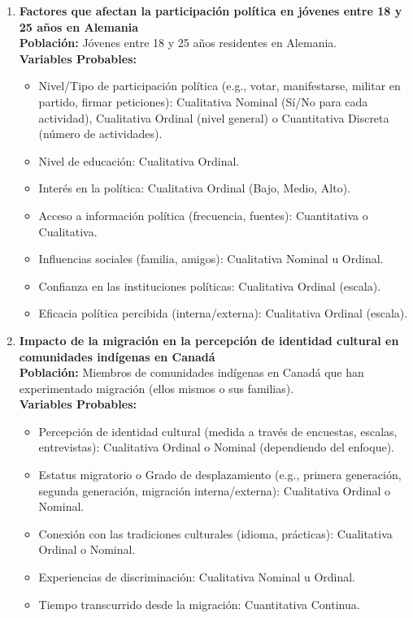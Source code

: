 \documentclass[12pt, letterpaper]{article}
\begin{document}
\begin{enumerate}
\item \textbf{Factores que afectan la participación política en jóvenes entre 18 y 25 años en Alemania} \\
\textbf{Población:} Jóvenes entre 18 y 25 años residentes en Alemania. \\
\textbf{Variables Probables:}
\begin{itemize}
  \item Nivel/Tipo de participación política (e.g., votar, manifestarse, militar en partido, firmar peticiones): Cualitativa Nominal (Sí/No para cada actividad), Cualitativa Ordinal (nivel general) o Cuantitativa Discreta (número de actividades).
  \item Nivel de educación: Cualitativa Ordinal.
  \item Interés en la política: Cualitativa Ordinal (Bajo, Medio, Alto).
  \item Acceso a información política (frecuencia, fuentes): Cuantitativa o Cualitativa.
  \item Influencias sociales (familia, amigos): Cualitativa Nominal u Ordinal.
  \item Confianza en las instituciones políticas: Cualitativa Ordinal (escala).
  \item Eficacia política percibida (interna/externa): Cualitativa Ordinal (escala).
\end{itemize}

\item \textbf{Impacto de la migración en la percepción de identidad cultural en comunidades indígenas en Canadá} \\
\textbf{Población:} Miembros de comunidades indígenas en Canadá que han experimentado migración (ellos mismos o sus familias). \\
\textbf{Variables Probables:}
\begin{itemize}
  \item Percepción de identidad cultural (medida a través de encuestas, escalas, entrevistas): Cualitativa Ordinal o Nominal (dependiendo del enfoque).
  \item Estatus migratorio o Grado de desplazamiento (e.g., primera generación, segunda generación, migración interna/externa): Cualitativa Ordinal o Nominal.
  \item Conexión con las tradiciones culturales (idioma, prácticas): Cualitativa Ordinal o Nominal.
  \item Experiencias de discriminación: Cualitativa Nominal u Ordinal.
  \item Tiempo transcurrido desde la migración: Cuantitativa Continua.
\end{itemize}


\end{enumerate}
\end{document}
